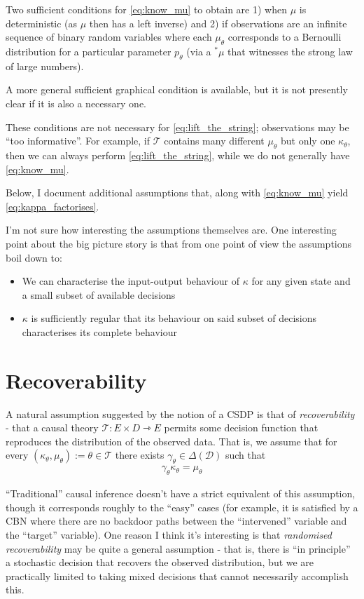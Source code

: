 Two sufficient conditions for \ref{eq:know_mu} to obtain are 1) when $\mu$ is deterministic (as $\mu$ then has a left inverse) and 2) if observations are an infinite sequence of binary random variables where each $\mu_\theta$ corresponds to a Bernoulli distribution for a particular parameter $p_\theta$ (via a $^*\mu$ that witnesses the strong law of large numbers).

A more general sufficient graphical condition is available, but it is not presently clear if it is also a necessary one.

These conditions are not necessary for \ref{eq:lift_the_string}; observations may be ``too informative''. For example, if $\mathscr{T}$ contains many different $\mu_\theta$ but only one $\kappa_\theta$, then we can always perform \ref{eq:lift_the_string}, while we do not generally have \ref{eq:know_mu}.

Below, I document additional assumptions that, along with \ref{eq:know_mu} yield \ref{eq:kappa_factorises}.

I'm not sure how interesting the assumptions themselves are. One interesting point about the big picture story is that from one point of view the assumptions boil down to:
\begin{itemize}
	\item We can characterise the input-output behaviour of $\kappa$ for any given state and a small subset of available decisions
	\item $\kappa$ is sufficiently regular that its behaviour on said subset of decisions characterises its complete behaviour
\end{itemize}

\section{Recoverability}

A natural assumption suggested by the notion of a CSDP is that of \emph{recoverability} - that a causal theory $\mathscr{T}:E\times D\rightarrowtriangle E$ permits some decision function that reproduces the distribution of the observed data. That is, we assume that for every $(\kappa_\theta,\mu_\theta):=\theta\in \mathscr{T}$ there exists $\gamma_{\theta}\in \Delta(\mathcal{D})$ such that
\begin{align}
	\gamma_{\theta}\kappa_\theta = \mu_\theta \label{eq:recoverability}
\end{align}

``Traditional'' causal inference doesn't have a strict equivalent of this assumption, though it corresponds roughly to the ``easy'' cases (for example, it is satisfied by a CBN where there are no backdoor paths between the ``intervened'' variable and the ``target'' variable). One reason I think it's interesting is that \emph{randomised recoverability} may be quite a general assumption - that is, there is ``in principle'' a stochastic decision that recovers the observed distribution, but we are practically limited to taking mixed decisions that cannot necessarily accomplish this.


